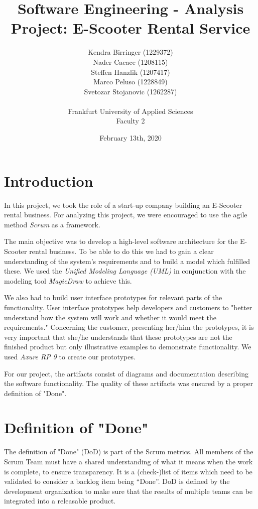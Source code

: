 \documentclass[a4paper, 12pt]{article}
\title{Software Engineering - Analysis\\
Project: E-Scooter Rental Service}
\author{
    Kendra Birringer (1229372)\\
    Nader Cacace (1208115)\\
    Steffen Hanzlik (1207417)\\
    Marco Peluso (1228849)\\
    Svetozar Stojanovic (1262287)\\
    \\
    Frankfurt University of Applied Sciences
    \\ Faculty 2
}
\date{February 13th, 2020}
\begin{document}
\maketitle
\newpage
\tableofcontents

\newpage
\section{Introduction}
In this project, we took the role of a start-up company building an E-Scooter rental business.
For analyzing this project, we were encouraged to use the agile method \emph{Scrum} \cite{scrum} as a framework.

The main objective was to develop a high-level software architecture for the E-Scooter rental business. To be able to do this we had to gain a clear understanding of the system's requirements and to build a model which fulfilled these. We used the \emph{Unified Modeling Language (UML)} \cite{uml} in conjunction with the modeling tool \emph{MagicDraw} \cite{magicdraw} to achieve this.

We also had to build user interface prototypes for relevant parts of the functionality. User interface prototypes help developers and customers to "better understand how the system will work and whether it would meet the requirements." \cite{thoma} Concerning the customer, presenting her/him the prototypes, it is very important that she/he understands that these prototypes are not the finished product but only illustrative examples to demonstrate functionality. We used \emph{Axure RP 9} \cite{axure} to create our prototypes.

For our project, the artifacts consist of diagrams and documentation describing the software functionality. The quality of these artifacts was ensured by a proper definition of "Done".

\section{Definition of "Done"}
The definition of "Done" (DoD) is part of the Scrum metrics. All members of the Scrum Team must have a shared understanding of what it means when the work is complete, to ensure transparency. \cite{scrumguide}
It is a (check-)list of items which need to be validated to consider a backlog item being “Done”. DoD is defined by the development organization to make sure that the results of multiple teams can be integrated into a releasable product. \cite{thoma1}
\end{document}
